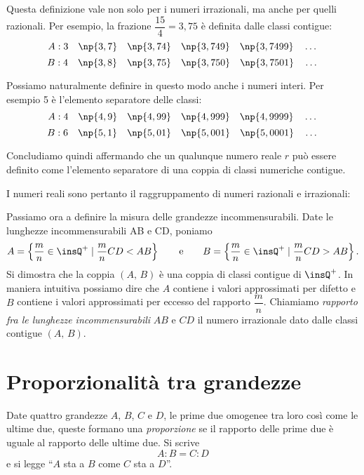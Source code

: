 Questa definizione vale non solo per i numeri irrazionali, ma anche 
per quelli razionali. Per esempio, la frazione \(\dfrac{15}{4}=3,75\) è 
definita dalle classi contigue:
\[A: 3\quad \np{3,7}\quad \np{3,74}\quad \np{3,749}\quad 
\np{3,7499}\quad \ldots{}\]
\[B: 4\quad \np{3,8}\quad \np{3,75}\quad \np{3,750}\quad 
\np{3,7501}\quad \ldots{}\]

Possiamo naturalmente definire in questo modo anche i numeri interi. 
Per esempio 5 è l'elemento separatore delle classi:
\[A: 4\quad \np{4,9}\quad \np{4,99}\quad \np{4,999}\quad 
\np{4,9999}\quad \ldots{}\]
\[B: 6\quad \np{5,1}\quad \np{5,01}\quad \np{5,001}\quad 
\np{5,0001}\quad \ldots{}\]

Concludiamo quindi affermando che un qualunque numero reale \(r\) può 
essere definito come l'elemento separatore di una coppia di classi 
numeriche contigue.

\pagebreak

I numeri reali sono pertanto il raggruppamento di numeri razionali e 
irrazionali:

\begin{figure*}[!htb]
	\centering
\end{figure*}

Passiamo ora a definire la misura delle grandezze incommensurabili.
Date le lunghezze incommensurabili AB e CD, poniamo
\[A=\left\{\dfrac{m}{n}\in\insQ^+\mid\dfrac{m}{n}CD<AB\right\}
\qquad\text{e} \qquad 
B=\left\{\dfrac{m}{n}\in\insQ^+\mid\dfrac{m}{n}CD>AB\right\}.\]
Si dimostra che la coppia \((A\text{, }B)\) è una coppia di classi 
contigue di \(\insQ^+\). In maniera intuitiva possiamo dire che \(A\) 
contiene i valori approssimati per difetto e \(B\) contiene i valori 
approssimati per eccesso del rapporto \(\dfrac{m}{n}\).
Chiamiamo \emph{rapporto fra le lunghezze incommensurabili} \(AB\) e 
\(CD\) il numero irrazionale dato dalle classi contigue \((A\text{, }B)\).


\section{Proporzionalità tra grandezze}\label{sect:proporzioni}

\begin{definizione}
Date quattro grandezze \(A\), \(B\), \(C\) e \(D\), le prime due omogenee tra 
loro così come le ultime due, queste formano una \emph{proporzione} 
se il rapporto delle prime due è uguale al rapporto delle ultime due. 
Si scrive
\[\boxed{A : B = C : D}\]
e si legge ``\(A\) sta a \(B\) come \(C\) sta a \(D\)''.
\end{definizione}


